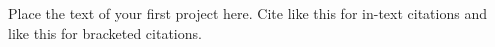 Place the text of your first project here. Cite like this \citet{Craik1947} for in-text citations and like this \citep{Craik1947} for bracketed citations.